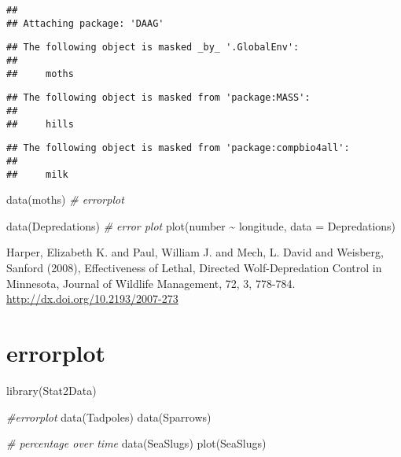 \documentclass[
]{book}
\newenvironment{Shaded}{\begin{snugshade}}{\end{snugshade}}
\newcommand{\AttributeTok}[1]{\textcolor[rgb]{0.77,0.63,0.00}{#1}}
\newcommand{\CommentTok}[1]{\textcolor[rgb]{0.56,0.35,0.01}{\textit{#1}}}
\newcommand{\FunctionTok}[1]{\textcolor[rgb]{0.00,0.00,0.00}{#1}}
\newcommand{\NormalTok}[1]{#1}
\newcommand{\SpecialCharTok}[1]{\textcolor[rgb]{0.00,0.00,0.00}{#1}}
\begin{document}
\begin{verbatim}
## 
## Attaching package: 'DAAG'
\end{verbatim}

\begin{verbatim}
## The following object is masked _by_ '.GlobalEnv':
## 
##     moths
\end{verbatim}

\begin{verbatim}
## The following object is masked from 'package:MASS':
## 
##     hills
\end{verbatim}

\begin{verbatim}
## The following object is masked from 'package:compbio4all':
## 
##     milk
\end{verbatim}

\begin{Shaded}
\begin{Highlighting}[]
\FunctionTok{data}\NormalTok{(moths) }\CommentTok{\# errorplot}
\end{Highlighting}
\end{Shaded}

\begin{Shaded}
\begin{Highlighting}[]
\FunctionTok{data}\NormalTok{(Depredations) }\CommentTok{\# error plot}
\FunctionTok{plot}\NormalTok{(number }\SpecialCharTok{\textasciitilde{}}\NormalTok{ longitude, }\AttributeTok{data =}\NormalTok{ Depredations)}
\end{Highlighting}
\end{Shaded}

Harper, Elizabeth K. and Paul, William J. and Mech, L. David and Weisberg, Sanford (2008), Effectiveness of Lethal, Directed Wolf-Depredation Control in Minnesota, Journal of Wildlife Management, 72, 3, 778-784. \url{http://dx.doi.org/10.2193/2007-273}

\hypertarget{errorplot}{%
\section{errorplot}\label{errorplot}}

\begin{Shaded}
\begin{Highlighting}[]
\FunctionTok{library}\NormalTok{(Stat2Data)}

\CommentTok{\#errorplot}
\FunctionTok{data}\NormalTok{(Tadpoles)}
\FunctionTok{data}\NormalTok{(Sparrows)}



\CommentTok{\# percentage over time}
\FunctionTok{data}\NormalTok{(SeaSlugs)}
\FunctionTok{plot}\NormalTok{(SeaSlugs)}
\end{Highlighting}
\end{Shaded}
\end{document}
